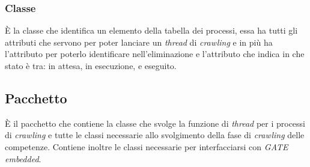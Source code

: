 \documentclass[tesi.tex]{subfiles}
\begin{document}
\subsubsection{Classe }
\begin{center}
\end{center}
\`E la classe che identifica un elemento della tabella dei processi,
essa ha tutti gli attributi che servono per poter lanciare un
\emph{thread} di \emph{crawling} e in pi\`u ha l'attributo
 per poterlo identificare nell'eliminazione e l'attributo
 che indica in che stato \`e tra: in attesa, in
esecuzione, e eseguito.

\subsection{Pacchetto }
\`E il pacchetto che contiene la classe che svolge la funzione
di \emph{thread} per i processi di \emph{crawling} e tutte le classi
necessarie allo svolgimento della fase di \emph{crawling} delle
competenze. Contiene inoltre le classi necessarie per interfacciarsi
con \emph{GATE embedded}.
\end{document}
